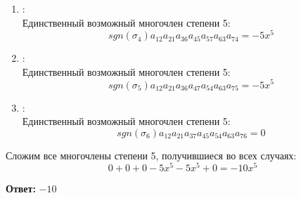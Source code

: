 \documentclass[a4paper]{article}
\begin{document}
\begin{enumerate}
\begin{enumerate}
        \item[]: \\
        Единственный возможный многочлен степени 5: 
        $$sgn(\sigma_4)a_{12}a_{21}a_{36}a_{45}a_{57}a_{63}a_{74} = -5x^5$$
        \item[]: \\
        Единственный возможный многочлен степени 5: 
        $$sgn(\sigma_5)a_{12}a_{21}a_{36}a_{47}a_{54}a_{63}a_{75} = -5x^5$$ 
        \item[]: \\
        Единственный возможный многочлен степени 5: 
        $$sgn(\sigma_6)a_{12}a_{21}a_{37}a_{45}a_{54}a_{63}a_{76} = 0$$ 

    \end{enumerate} 
    Сложим все многочлены степени 5, получившиеся во всех случаях:
    $$0 + 0+ 0 -5x^5 - 5x^5 + 0 = -10x^5$$

    \textbf{Ответ: } $-10$
\end{enumerate}
\end{document}
